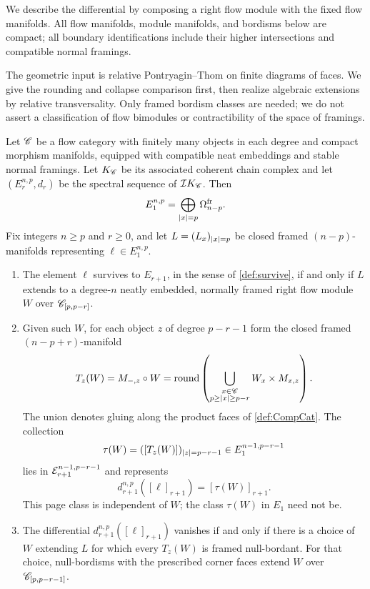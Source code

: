 We describe the differential by composing a right flow module with the fixed flow manifolds. All flow manifolds, module manifolds, and bordisms below are compact; all boundary identifications include their higher intersections and compatible normal framings.

The geometric input is relative Pontryagin--Thom on finite diagrams of faces. We give the rounding and collapse comparison first, then realize algebraic extensions by relative transversality. Only framed bordism classes are needed; we do not assert a classification of flow bimodules or contractibility of the space of framings.


\begin{thm}\label{cor:SSofFFCat}
    Let $\mathscr{C}$ be a flow category with finitely many objects in each degree and compact morphism manifolds, equipped with compatible neat embeddings and stable normal framings. Let $K_{\mathscr{C}}$ be its associated coherent chain complex and let $(E_r^{n,p},d_r)$ be the spectral sequence of $\mathcal{I} K_{\mathscr{C}}$. Then
    \[
        E_1^{n,p}=\bigoplus_{\left\lvert x\right\rvert=p}\Omega^{\operatorname{fr}}_{n-p}.
    \]
    Fix integers $n\geq p$ and $r\geq0$, and let
    $L=(L_x)_{\left\lvert x\right\rvert=p}$ be closed framed $(n-p)$-manifolds representing $\ell\in E_1^{n,p}$.
    \begin{enumerate}
        \item The element $\ell$ survives to $E_{r+1}$, in the sense of \cref{def:survive}, if and only if $L$ extends to a degree-$n$ neatly embedded, normally framed right flow module $W$ over $\mathscr{C}_{[p,p-r]}$.
        \item Given such $W$, for each object $z$ of degree $p-r-1$ form the closed framed $(n-p+r)$-manifold
        \[
            T_z(W)=M_{-,z}\circ W
            =\operatorname{round}\left(
              \bigcup_{\substack{x\in\mathscr{C}\\p\geq\left\lvert x\right\rvert\geq p-r}}
              W_x\times M_{x,z}\right).
        \]
        The union denotes gluing along the product faces of \cref{def:CompCat}. The collection
        \[
            \tau(W)=([T_z(W)])_{\left\lvert z\right\rvert=p-r-1}
            \in E_1^{n-1,p-r-1}
        \]
        lies in $\mathcal{E}_{r+1}^{n-1,p-r-1}$ and represents
        \[
            d_{r+1}^{n,p}([\ell]_{r+1})
            =[\tau(W)]_{r+1}.
        \]
        This page class is independent of $W$; the class $\tau(W)$ in $E_1$ need not be.
        \item The differential $d_{r+1}^{n,p}([\ell]_{r+1})$ vanishes if and only if there is a choice of $W$ extending $L$ for which every $T_z(W)$ is framed null-bordant. For that choice, null-bordisms with the prescribed corner faces extend $W$ over $\mathscr{C}_{[p,p-r-1]}$.
    \end{enumerate}
\end{thm}

